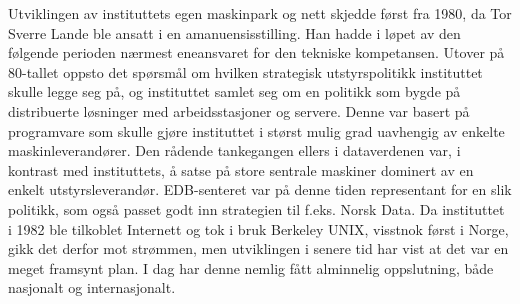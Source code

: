 Utviklingen av instituttets egen maskinpark og nett skjedde først fra 1980, da Tor Sverre Lande ble ansatt i en amanuensisstilling. Han hadde i løpet av den følgende perioden nærmest eneansvaret for den tekniske kompetansen. Utover på 80-tallet oppsto det spørsmål om hvilken strategisk utstyrspolitikk instituttet skulle legge seg på, og instituttet samlet seg om en politikk som bygde på distribuerte løsninger med arbeidsstasjoner og servere. Denne var basert på programvare som skulle gjøre instituttet i størst mulig grad uavhengig av enkelte maskinleverandører. Den rådende tankegangen ellers i dataverdenen var, i kontrast med instituttets, å satse på store sentrale maskiner dominert av en enkelt utstyrsleverandør. EDB-senteret var på denne tiden representant for en slik politikk, som også passet godt inn strategien til f.eks. Norsk Data. Da instituttet i 1982 ble tilkoblet Internett og tok i bruk Berkeley UNIX, visstnok først i Norge, gikk det derfor mot strømmen, men utviklingen i senere tid har vist at det var en meget framsynt plan. I dag har denne nemlig fått alminnelig oppslutning, både nasjonalt og internasjonalt.